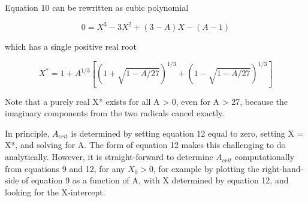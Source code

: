 \documentclass[10pt,letterpaper]{article}
\begin{document}
Equation 10 can be rewritten as cubic polynomial

\begin{equation}
\label{drho_6}
0 = X^3 - 3X^2 + \left(3-A\right)X - \left(A-1\right)
\end{equation}

which has a single positive real root

\begin{equation}
\label{drho_6}
X^* = 1 + A^{1/3} \left[\left(1+\sqrt{1-A/27}\right)^{1/3} + \left(1-\sqrt{1-A/27}\right)^{1/3}\right]
\end{equation}

Note that a purely real X* exists for all A > 0, even for A > 27, because the imaginary components from the two radicals cancel exactly.

In principle, $A_{crit}$ is determined by setting equation 12 equal to zero, setting X = X*, and solving for A. The form of equation 12 makes this challenging to do analytically. However, it is straight-forward to determine $A_{crit}$ computationally from equations 9 and 12, for any $X_0 > 0$, for example by plotting the right-hand-side of equation 9 as a function of A, with X determined by equation 12, and looking for the X-intercept.
\end{document}
